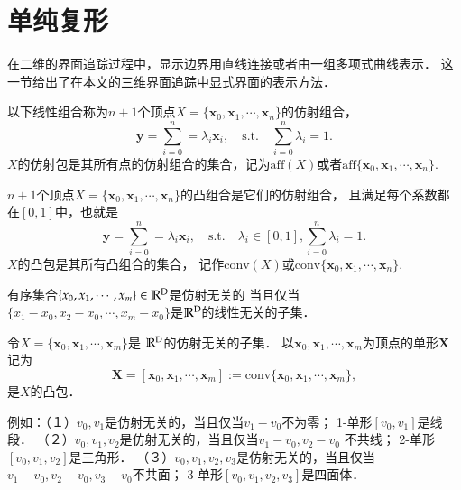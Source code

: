 \section{单纯复形}
\label{sec:simplex}
在二维的界面追踪过程中，显示边界用直线连接或者由一组多项式曲线表示．
这一节给出了在本文的三维界面追踪中显式界面的表示方法．

\begin{defn}
	以下线性组合称为$n+1$个顶点$X=\{\mathbf{x}_0, \mathbf{x}_1, \cdots, \mathbf{x}_n\}$的仿射组合，
	\begin{equation*}
	\mathbf{y}=\sum_{i=0}^{n}=\lambda_i \mathbf{x}_i, \quad\text{s.t.}\quad \sum_{i=0}^{n}\lambda_i=1.
	\end{equation*}
	$X$的仿射包是其所有点的仿射组合的集合，记为$\text{aff}(X)$或者$\text{aff}\{\mathbf{x}_0, \mathbf{x}_1, \cdots,\mathbf{x}_n\}.$
	\end{defn}

\begin{defn}
	$n+1$个顶点$X=\{\mathbf{x}_0, \mathbf{x}_1,\cdots, \mathbf{x}_n\}$的凸组合是它们的仿射组合，
	且满足每个系数都在$[0,1]$中，也就是
	\begin{equation*}
	\mathbf{y}=\sum_{i=0}^{n}=\lambda_i \mathbf{x}_i, \quad\text{s.t.}\quad \lambda_i\in[0,1], \sum_{i=0}^{n}\lambda_i=1.
	\end{equation*}
	$X$的凸包是其所有凸组合的集合，
	记作$\text{conv}(X)$或$\text{conv}\{\mathbf{x}_0,\mathbf{x}_1,\cdots,\mathbf{x}_n\}$.
	\end{defn}

\begin{defn}
	有序集合$\{x_0, x_1, \cdots ,x_m\}\in \mathbb{R}^{\textup{D}}$是仿射无关的
	当且仅当$\{x_1-x_0, x_2-x_0, \cdots, x_m-x_0 \}$是$\mathbb{R}^{\textup{D}}$的线性无关的子集．
	\end{defn}

\begin{defn}
	令$X=\{\mathbf{x}_0,\mathbf{x}_1, \cdots, \mathbf{x}_m\}$是
	$\mathbb{R}^{\textup{D}}$的仿射无关的子集．
	以$\mathbf{x}_0,\mathbf{x}_1, \cdots, \mathbf{x}_m$为顶点的单形$\mathbf{X}$记为
	\begin{equation*}
	\mathbf{X}=[\mathbf{x}_0,\mathbf{x}_1, \cdots, \mathbf{x}_m]:= \text{conv}\{\mathbf{x}_0, \mathbf{x}_1, \cdots, \mathbf{x}_m\},
	\end{equation*}
	是$X$的凸包．
	\end{defn}

例如：（１）$v_0,v_1$是仿射无关的，当且仅当$v_1-v_0$不为零；
1-单形$[v_0,v_1]$是线段．
（２）$v_0,v_1,v_2$是仿射无关的，当且仅当$v_1-v_0, v_2-v_0$ 不共线；
2-单形$[v_0,v_1,v_2]$是三角形．
（３）$v_0,v_1,v_2,v_3$是仿射无关的，当且仅当$v_1-v_0,v_2-v_0,v_3-v_0$不共面；
3-单形$[v_0,v_1,v_2,v_3]$是四面体．

